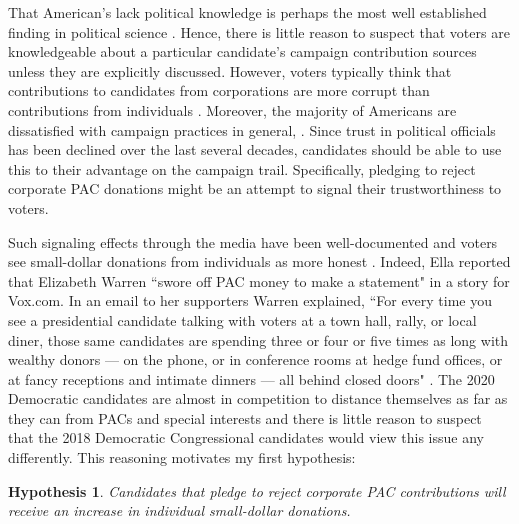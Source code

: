 \documentclass[12pt]{article}
\newtheorem{hyp}{Hypothesis}
\begin{document}
 That American's lack political knowledge is perhaps the most well established finding in political science \citep{page_rational_1992, carpini_what_1997}. Hence, there is little reason to suspect that voters are knowledgeable about a particular candidate's campaign contribution sources unless they are explicitly discussed. However, voters typically think that contributions to candidates from corporations are more corrupt than contributions from individuals \citep{bowler_campaign_2016}. Moreover, the majority of Americans are dissatisfied with campaign practices in general, \citep{mayer_public_2001, persily_perceptions_2004}. Since trust in political officials has been declined over the last several decades, candidates should be able to use this to their advantage on the campaign trail. Specifically, pledging to reject corporate PAC donations might be an attempt to signal their trustworthiness to voters. 
 
 Such signaling effects through the media have been well-documented \citep{iyengar_news_1989} and voters see small-dollar donations from individuals as more honest \citep{bowler_campaign_2016}. Indeed, Ella \citet{nilsen_race_2019} reported that Elizabeth Warren ``swore off PAC money to make a statement" in a story for Vox.com. In an email to her supporters Warren explained, ``For every time you see a presidential candidate talking with voters at a town hall, rally, or local diner, those same candidates are spending three or four or five times as long with wealthy donors — on the phone, or in conference rooms at hedge fund offices, or at fancy receptions and intimate dinners — all behind closed doors" \citep{nilsen_race_2019}. The 2020 Democratic candidates are almost in competition to distance themselves as far as they can from PACs and special interests and there is little reason to suspect that the 2018 Democratic Congressional candidates would view this issue any differently. This reasoning motivates my first hypothesis:  
 
 \begin{hyp}
 	Candidates that pledge to reject corporate PAC contributions will receive an increase in individual small-dollar donations. 
 \end{hyp}
 
\end{document}
